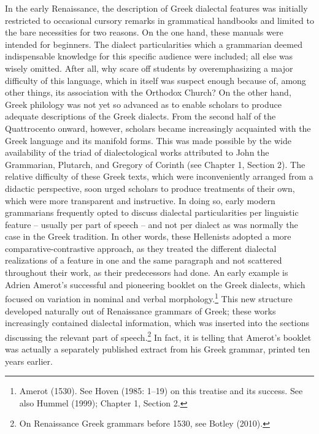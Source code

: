 \documentclass[12pt]{article}
\makeatletter
\renewcommand\subsection{\@startsection{subsection}{2}{0.1972in}{0.1665in}{0.0835in}{\normalfont\normalsize\fontsize{12pt}{14.4pt}\selectfont\rmfamily\bfseries}}
\newenvironment{styleStandard}{\renewcommand\baselinestretch{1.25}\setlength\leftskip{0in}\setlength\rightskip{0in}\setlength\parindent{0.1972in}\setlength\parfillskip{0pt plus 1fil}\setlength\parskip{0in plus 1pt}\writerlistparindent\writerlistleftskip\leavevmode\normalfont\normalsize\writerlistlabel\ignorespaces}{\unskip\vspace{0in plus 1pt}\par}
\newcommand\writerlistleftskip{}
\newcommand\writerlistparindent{}
\newcommand\writerlistlabel{}
\makeatother
\begin{document}
\subsection{The heritage of pathology}
\hypertarget{Toc19704845}{}\begin{styleStandard}
In the early Renaissance, the description of Greek dialectal features was initially restricted to occasional cursory remarks in grammatical handbooks and limited to the bare necessities for two reasons. On the one hand, these manuals were intended for beginners. The dialect particularities which a grammarian deemed indispensable knowledge for this specific audience were included; all else was wisely omitted. After all, why scare off students by overemphasizing a major difficulty of this language, which in itself was suspect enough because of, among other things, its association with the Orthodox Church? On the other hand, Greek philology was not yet so advanced as to enable scholars to produce adequate descriptions of the Greek dialects. From the second half of the Quattrocento onward, however, scholars became increasingly acquainted with the Greek language and its manifold forms. This was made possible by the wide availability of the triad of dialectological works attributed to John the Grammarian, Plutarch, and Gregory of Corinth (see Chapter 1, Section 2). The relative difficulty of these Greek texts, which were inconveniently arranged from a didactic perspective, soon urged scholars to produce treatments of their own, which were more transparent and instructive. In doing so, early modern grammarians frequently opted to discuss dialectal particularities per linguistic feature – usually per part of speech – and not per dialect as was normally the case in the Greek tradition. In other words, these Hellenists adopted a more comparative-contrastive approach, as they treated the different dialectal realizations of a feature in one and the same paragraph and not scattered throughout their work, as their predecessors had done. An early example is Adrien Amerot’s successful and pioneering booklet on the Greek dialects, which focused on variation in nominal and verbal morphology.\footnote{\textrm{ Amerot (1530). See Hoven (1985: 1–19) on this treatise and its success. See also Hummel (1999); Chapter 1, Section 2.}} This new structure developed naturally out of Renaissance grammars of Greek; these works increasingly contained dialectal information, which was inserted into the sections discussing the relevant part of speech.\footnote{\textrm{ On Renaissance Greek grammars before 1530, see Botley (2010).}} In fact, it is telling that Amerot’s booklet was actually a separately published extract from his Greek grammar, printed ten years earlier.
\end{styleStandard}
\end{document}
